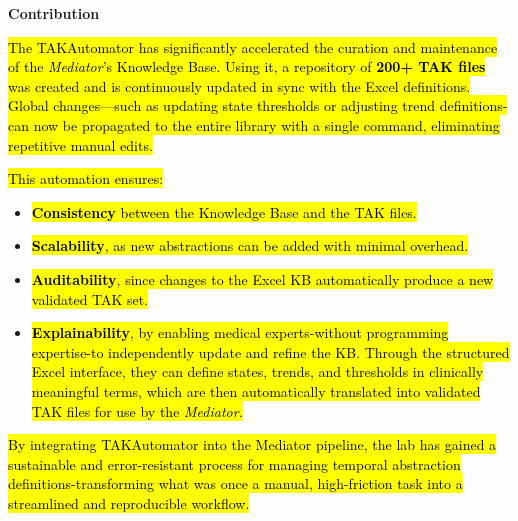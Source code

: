 \documentclass[
]{article}
\begin{document}
\textbf{Contribution}

\hl{The TAKAutomator has significantly accelerated the curation and
maintenance of the \emph{Mediator}'s Knowledge Base. Using it, a
repository of \textbf{200+ TAK files} was created and is continuously
updated in sync with the Excel definitions. Global changes---such as
updating state thresholds or adjusting trend definitions-can now be
propagated to the entire library with a single command, eliminating
repetitive manual edits.}

\hl{This automation ensures:}

\begin{itemize}
\item
  \hl{\textbf{Consistency} between the Knowledge Base and the TAK
  files.}
\item
  \hl{\textbf{Scalability}, as new abstractions can be added with
  minimal overhead.}
\item
  \hl{\textbf{Auditability}, since changes to the Excel KB automatically
  produce a new validated TAK set.}
\item
  \hl{\textbf{Explainability}, by enabling medical experts-without
  programming expertise-to independently update and refine the KB.
  Through the structured Excel interface, they can define states,
  trends, and thresholds in clinically meaningful terms, which are then
  automatically translated into validated TAK files for use by the
  \emph{Mediator}.}
\end{itemize}

\hl{By integrating TAKAutomator into the Mediator pipeline, the lab has
gained a sustainable and error-resistant process for managing temporal
abstraction definitions-transforming what was once a manual,
high-friction task into a streamlined and reproducible workflow.}
\end{document}

